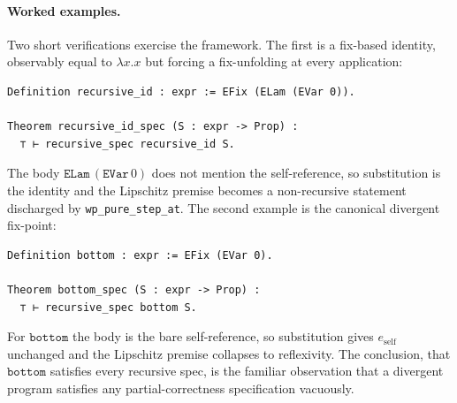 \paragraph{Worked examples.}
Two short verifications exercise the framework.  The first is a
fix-based identity, observably equal to $\lambda x.x$ but forcing a
fix-unfolding at every application:
\begin{lstlisting}
Definition recursive_id : expr := EFix (ELam (EVar 0)).

Theorem recursive_id_spec (S : expr -> Prop) :
  ⊤ ⊢ recursive_spec recursive_id S.
\end{lstlisting}
\noindent
The body $\mathtt{ELam}\, (\mathtt{EVar}\, 0)$ does not mention the
self-reference, so substitution is the identity and the Lipschitz
premise becomes a non-recursive statement discharged by
\texttt{wp\_pure\_step\_at}.  The second example is the canonical
divergent fix-point:
\begin{lstlisting}
Definition bottom : expr := EFix (EVar 0).

Theorem bottom_spec (S : expr -> Prop) :
  ⊤ ⊢ recursive_spec bottom S.
\end{lstlisting}
\noindent
For $\mathtt{bottom}$ the body is the bare self-reference, so
substitution gives $e_{\mathrm{self}}$ unchanged and the Lipschitz
premise collapses to reflexivity.  The conclusion, that
$\mathtt{bottom}$ satisfies every recursive spec, is the familiar
observation that a divergent program satisfies any partial-correctness
specification vacuously.
